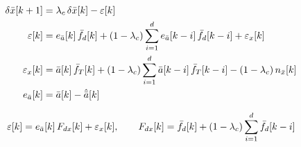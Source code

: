 \[
\begin{aligned}
\delta\bar{x}[k+1] &= \lambda_c\,\delta\bar{x}[k] - \varepsilon[k] \\
\varepsilon[k] &= e_{\bar{a}}[k]\,\bar f_d[k] + (1-\lambda_c)\sum_{i=1}^{d} e_{\bar{a}}[k-i]\,\bar f_d[k-i] + \varepsilon_x[k] \\
\varepsilon_x[k] &= \bar{a}[k]\,\bar f_T[k] + (1-\lambda_c)\sum_{i=1}^{d} \bar{a}[k-i]\,\bar f_T[k-i] - (1-\lambda_c)\, n_{\bar{x}}[k] \\
e_{\bar{a}}[k] &= \bar{a}[k] - \hat{\bar{a}}[k]
\end{aligned}
\]

\[
\varepsilon[k] = e_{\bar{a}}[k]\,F_{dx}[k] + \varepsilon_x[k], \qquad
F_{dx}[k] = \bar f_d[k] + (1-\lambda_c)\sum_{i=1}^{d} \bar f_d[k-i]
\]
